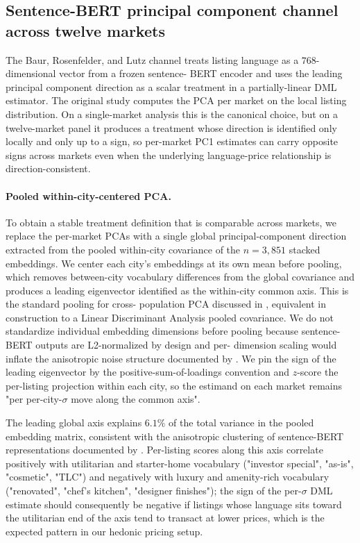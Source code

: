 
\subsection{Sentence-BERT principal component channel across twelve markets}
\label{sec:baur-12city}

The Baur, Rosenfelder, and Lutz channel \citep{baur2023analysis} treats
listing language as a $768$-dimensional vector from a frozen sentence-
BERT encoder and uses the leading principal component direction as a
scalar treatment in a partially-linear DML estimator. The original
study computes the PCA per market on the local listing distribution.
On a single-market analysis this is the canonical choice, but on a
twelve-market panel it produces a treatment whose direction is
identified only locally and only up to a sign, so per-market PC1
estimates can carry opposite signs across markets even when the
underlying language-price relationship is direction-consistent.

\paragraph{Pooled within-city-centered PCA.} To obtain a stable
treatment definition that is comparable across markets, we replace the
per-market PCAs with a single global principal-component direction
extracted from the pooled within-city covariance of the $n = 3{,}851$
stacked embeddings.  We center each city's embeddings at its own mean
before pooling, which removes between-city vocabulary differences from
the global covariance and produces a leading eigenvector identified as
the within-city common axis.  This is the standard pooling for cross-
population PCA discussed in \citet{flury1984}, equivalent in
construction to a Linear Discriminant Analysis pooled covariance.
We do not standardize individual embedding dimensions before pooling
because sentence-BERT outputs are L2-normalized by design and per-
dimension scaling would inflate the anisotropic noise structure
documented by \citet{ethayarajh2019contextual}.  We pin the sign of
the leading eigenvector by the positive-sum-of-loadings convention and
$z$-score the per-listing projection within each city, so the
estimand on each market remains "per per-city-$\sigma$ move along the
common axis".

The leading global axis explains $6.1\%$ of the total variance in
the pooled embedding matrix, consistent with the anisotropic
clustering of sentence-BERT representations documented by
\citet{ethayarajh2019contextual}. Per-listing scores along this axis
correlate positively with utilitarian and starter-home vocabulary
("investor special", "as-is", "cosmetic", "TLC") and negatively with
luxury and amenity-rich vocabulary ("renovated", "chef's kitchen",
"designer finishes"); the sign of the per-$\sigma$ DML estimate
should consequently be negative if listings whose language sits
toward the utilitarian end of the axis tend to transact at lower
prices, which is the expected pattern in our hedonic pricing setup.

